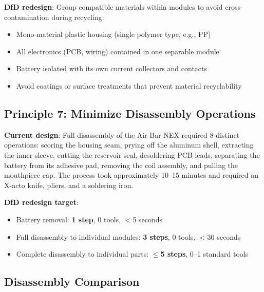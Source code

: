 \textbf{DfD redesign}: Group compatible materials within modules to avoid cross-contamination during recycling:
\begin{itemize}
    \item Mono-material plastic housing (single polymer type, e.g., PP)
    \item All electronics (PCB, wiring) contained in one separable module
    \item Battery isolated with its own current collectors and contacts
    \item Avoid coatings or surface treatments that prevent material recyclability
\end{itemize}

\subsection{Principle 7: Minimize Disassembly Operations}

\textbf{Current design}: Full disassembly of the Air Bar NEX required 8 distinct operations: scoring the housing seam, prying off the aluminum shell, extracting the inner sleeve, cutting the reservoir seal, desoldering PCB leads, separating the battery from its adhesive pad, removing the coil assembly, and pulling the mouthpiece cap. The process took approximately 10--15 minutes and required an X-acto knife, pliers, and a soldering iron.

\textbf{DfD redesign target}:
\begin{itemize}
    \item Battery removal: \textbf{1 step}, 0 tools, $<$5 seconds
    \item Full disassembly to individual modules: \textbf{3 steps}, 0 tools, $<$30 seconds
    \item Complete disassembly to individual parts: \textbf{$\leq$5 steps}, 0--1 standard tools
\end{itemize}

\subsection{Disassembly Comparison}

